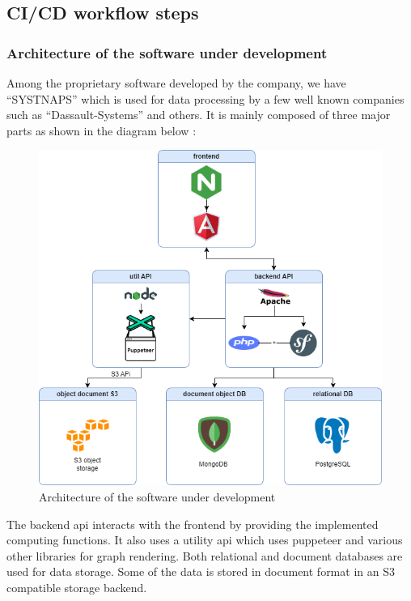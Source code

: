 \subsection{CI/CD workflow steps }

\subsubsection{Architecture of the software under development }

Among the proprietary software developed by the company, we have “SYSTNAPS” which is used for data processing by a few well known companies such as “Dassault-Systems” and others. It is mainly composed of three major parts as shown in the diagram below : 

\begin{figure}[H]\centering
\includegraphics[width=1.0\textwidth,angle=00]{assets/f47.png}
\caption{Architecture of the software under development}
\label{fig:Architecture of the software under development}
\end{figure}

The backend api interacts with the frontend by providing the implemented computing functions. It also uses a utility api which uses puppeteer and various other libraries for graph rendering. Both relational and document databases are used for data storage. Some of the data is stored in document format in an S3 compatible storage backend.

